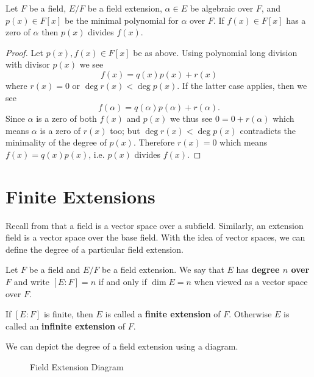 \begin{corollary}\label{corollary-minimal-polynomial-divides-polynomial-with-same-root}
    Let $F$ be a field, $E/F$ be a field extension, $\alpha \in E$ be algebraic over $F$, and $p(x) \in F[x]$ be the minimal polynomial for $\alpha$ over $F$. If $f(x) \in F[x]$ has a zero of $\alpha$ then $p(x)$ divides $f(x)$.
\end{corollary}
\begin{proof}
    Let $p(x), f(x) \in F[x]$ be as above. Using polynomial long division with divisor $p(x)$ we see
    \[
        f(x) = q(x)p(x) + r(x)
    \]
    where $r(x) = 0$ or $\deg r(x) < \deg p(x)$. If the latter case applies, then we see
    \[
        f(\alpha) = q(\alpha)p(\alpha) + r(\alpha).
    \]
    Since $\alpha$ is a zero of both $f(x)$ and $p(x)$ we thus see $0 = 0 + r(\alpha)$ which means $\alpha$ is a zero of $r(x)$ too; but $\deg r(x) < \deg p(x)$ contradicts the minimality of the degree of $p(x)$. Therefore $r(x) = 0$ which means $f(x) = q(x)p(x)$, i.e. $p(x)$ divides $f(x)$.
\end{proof}

\section{Finite Extensions}
Recall from  that a field is a vector space over a subfield. Similarly, an extension field is a vector space over the base field. With the idea of vector spaces, we can define the degree of a particular field extension.

\begin{definition}
    Let $F$ be a field and $E/F$ be a field extension. We say that $E$ has \textbf{degree $n$ over $F$} and write $[E:F] = n$ if and only if $\dim E = n$ when viewed as a vector space over $F$.

    If $[E:F]$ is finite, then $E$ is called a \textbf{finite extension} of $F$. Otherwise $E$ is called an \textbf{infinite extension} of $F$.
\end{definition}

We can depict the degree of a field extension using a diagram.
\begin{figure}[H]
    \centering
    \caption{Field Extension Diagram}
\end{figure}


